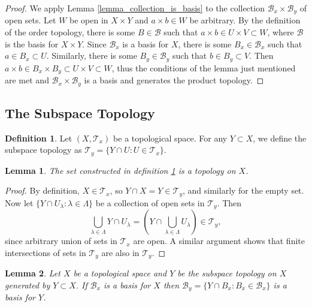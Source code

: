 \documentclass{article}
\newtheorem{lemma}{Lemma}[subsection]
\theoremstyle{definition}
\newtheorem{definition}{Definition}[subsection]
\theoremstyle{remark}
\newcommand{\paren}[1]{\left( #1 \right)}
\newcommand{\set}[1]{\{#1\}}
\newcommand{\prt}[1]{\mathcal{#1}}
\begin{document}
\begin{proof}
    We apply Lemma \ref{lemma_collection_is_basis} to the collection $\prt{B}_x \times \prt{B}_y$ of open sets. Let $W$ be open in $X \times Y$ and $a \times b \in W$ be arbitrary. By the definition of the order topology, there is some $B \in \prt{B}$ such that $a \times b \in U \times V \subset W$, where $\prt{B}$ is the basis for $X \times Y$. Since $\prt{B}_x$ is a basis for $X$, there is some $B_x \in \prt{B}_x$ such that $a \in B_x \subset U$. Similarly, there is some $B_y \in \prt{B}_y$ such that $b \in B_y \subset V$. Then $a \times b \in B_x \times B_y \subset U \times V \subset W$, thus the conditions of the lemma just mentioned are met and $\prt{B}_x \times \prt{B}_y$ is a basis and generates the product topology.
\end{proof}

\subsection{The Subspace Topology}

\begin{definition}\label{def_subspace_topology}
    Let $(X, \prt{T}_x)$ be a topological space. For any $Y \subset X$, we define the subspace topology as $\prt{T}_y = \set{Y \cap U : U \in \prt{T}_x}$.
\end{definition}

\begin{lemma}
    The set constructed in definition \ref{def_subspace_topology} is a topology on $X$.
\end{lemma}

\begin{proof}
    By definition, $X \in \prt{T}_x$, so $Y \cap X = Y \in \prt{T}_y$, and similarly for the empty set. Now let $\set{Y \cap U_\lambda : \lambda \in \Lambda}$ be a collection of open sets in $\prt{T}_y$. Then 
    \begin{equation*}
        \bigcup_{\lambda \in \Lambda} Y \cap U_{\lambda} = \paren{Y \cap  \bigcup_{\lambda \in \Lambda} U_{\lambda}} \in \prt{T}_y, 
    \end{equation*} since arbitrary union of sets in $\prt{T}_x$ are open. A similar argument shows that finite intersections of sets in $\prt{T}_y$ are also in $\prt{T}_y$.
\end{proof}

\begin{lemma}
    Let $X$ be a topological space and $Y$ be the subspace topology on $X$ generated by $Y \subset X$. If $\prt{B}_x$ is a basis for $X$ then $\prt{B}_y = \set{Y \cap B_x : B_x \in \prt{B}_x}$ is a basis for $Y$.
\end{lemma}
\end{document}
